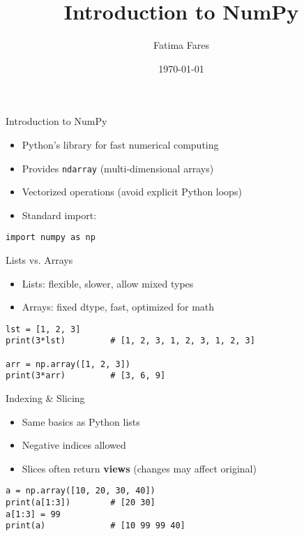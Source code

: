 \documentclass{beamer}
\title{Introduction to NumPy}
\author{Fatima Fares}
\institute{Constructor University}
\date{\today}
\begin{document}
\begin{frame}
  \titlepage
\end{frame}

\begin{frame}[fragile]{Introduction to NumPy}
\begin{itemize}
  \item Python's library for fast numerical computing
  \item Provides \texttt{ndarray} (multi-dimensional arrays)
  \item Vectorized operations (avoid explicit Python loops)
  \item Standard import:
\end{itemize}
\begin{verbatim}
import numpy as np
\end{verbatim}
\end{frame}

\begin{frame}[fragile]{Lists vs. Arrays}
\begin{itemize}
  \item Lists: flexible, slower, allow mixed types
  \item Arrays: fixed dtype, fast, optimized for math
\end{itemize}
\begin{verbatim}
lst = [1, 2, 3]
print(3*lst)         # [1, 2, 3, 1, 2, 3, 1, 2, 3]

arr = np.array([1, 2, 3])
print(3*arr)         # [3, 6, 9]
\end{verbatim}
\end{frame}

\begin{frame}[fragile]{Indexing \& Slicing}
\begin{itemize}
  \item Same basics as Python lists
  \item Negative indices allowed
  \item Slices often return \textbf{views} (changes may affect original)
\end{itemize}
\begin{verbatim}
a = np.array([10, 20, 30, 40])
print(a[1:3])        # [20 30]
a[1:3] = 99
print(a)             # [10 99 99 40]
\end{verbatim}
\end{frame}
\end{document}
